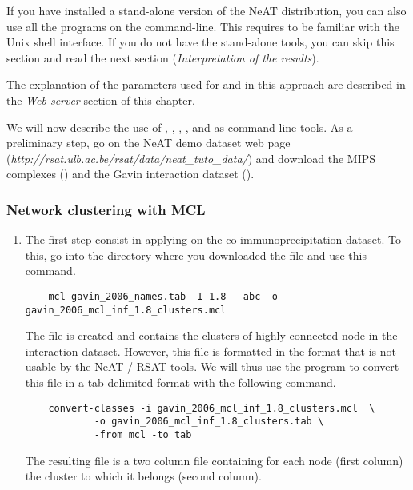 If you have installed a stand-alone version of the NeAT distribution,
you can also use all the programs on the 
command-line. This requires to be familiar with the Unix shell
interface. If you do not have the stand-alone tools, you can skip this
section and read the next section (\textit{Interpretation of the results}).

The explanation of the parameters used for  and  in this approach are described in the \textit{Web server} section of this chapter.

We will now describe the use of , , , ,   and  as command line tools. 
As a preliminary step, go on the NeAT demo dataset web page (\textit{http://rsat.ulb.ac.be/rsat/data/neat\_tuto\_data/}) and download the MIPS complexes () and the Gavin interaction dataset ().



\subsubsection{Network clustering with MCL}
\begin{enumerate}
\item The first step consist in applying  on the co-immunoprecipitation dataset. 
To this, go into the directory where you downloaded the file  and use this command. 
	
	{\color{Blue} \begin{footnotesize} 
		\begin{verbatim}
	mcl gavin_2006_names.tab -I 1.8 --abc -o gavin_2006_mcl_inf_1.8_clusters.mcl
		\end{verbatim} \end{footnotesize}
	}		
The file  is created and contains the clusters of highly connected node in the interaction dataset. However, this file is formatted in the  format that is not usable by the NeAT / RSAT tools. We will thus use the program  to convert this file in a tab delimited format with
the following command.


	{\color{Blue} \begin{footnotesize} 
		\begin{verbatim}
	convert-classes -i gavin_2006_mcl_inf_1.8_clusters.mcl  \
			-o gavin_2006_mcl_inf_1.8_clusters.tab \
			-from mcl -to tab
		\end{verbatim} \end{footnotesize}
	}
The resulting file is a two column file containing for each node (first column) the cluster to which it belongs (second column).
\end{enumerate}
